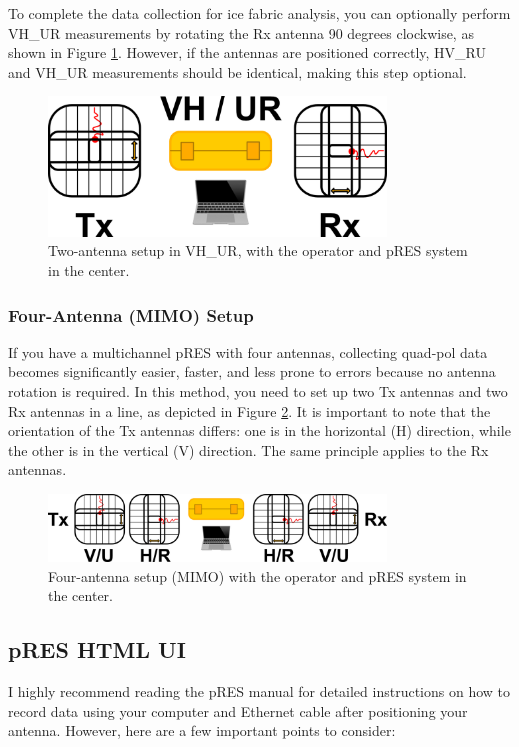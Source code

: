 \documentclass[a4paper,12pt]{article}
\begin{document}
To complete the data collection for ice fabric analysis, you can optionally perform VH\_UR
measurements by rotating the Rx antenna 90 degrees clockwise, as shown in Figure \ref{fig:VHUR}.
However, if the antennas are positioned correctly, HV\_RU and VH\_UR measurements should be identical,
making this step optional.

\begin{figure}[H]
    \centering
    \includegraphics[width=0.8\textwidth]{figures/VHUR.png}
    \caption{Two-antenna setup in VH\_UR, with the operator and pRES system in the center.}
    \label{fig:VHUR}
\end{figure}

\subsubsection{Four-Antenna (MIMO) Setup}
If you have a multichannel pRES with four antennas, collecting quad-pol data becomes significantly
easier, faster, and less prone to errors because no antenna rotation is required. In this method,
you need to set up two Tx antennas and two Rx antennas in a line, as depicted in Figure
\ref{fig:MIMO}. It is important to note that the orientation of the Tx antennas differs: one is in
the horizontal (H) direction, while the other is in the vertical (V) direction. The same principle
applies to the Rx antennas.

\begin{figure}[h!]
\centering
\includegraphics[width=0.8\textwidth]{figures/MIMO.png}
\caption{Four-antenna setup (MIMO) with the operator and pRES system in the center.}
\label{fig:MIMO}
\end{figure}

\subsection{pRES HTML UI}
I highly recommend reading the pRES manual for detailed instructions on how to record data using
your computer and Ethernet cable after positioning your antenna. However, here are a few important
points to consider:
\end{document}
